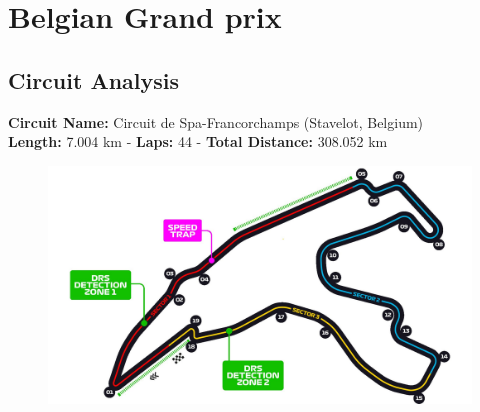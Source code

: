 \section{Belgian Grand prix}

\subsection{Circuit Analysis}

\textbf{Circuit Name:} Circuit de Spa-Francorchamps (Stavelot, Belgium) \\
\textbf{Length:} 7.004 km - \textbf{Laps:} 44 - \textbf{Total Distance:} 308.052 km

\begin{figure}[H]
    \centering
    \includegraphics[width=0.75\linewidth]{images/14.Belgium_Circuit.jpg}
\end{figure}


